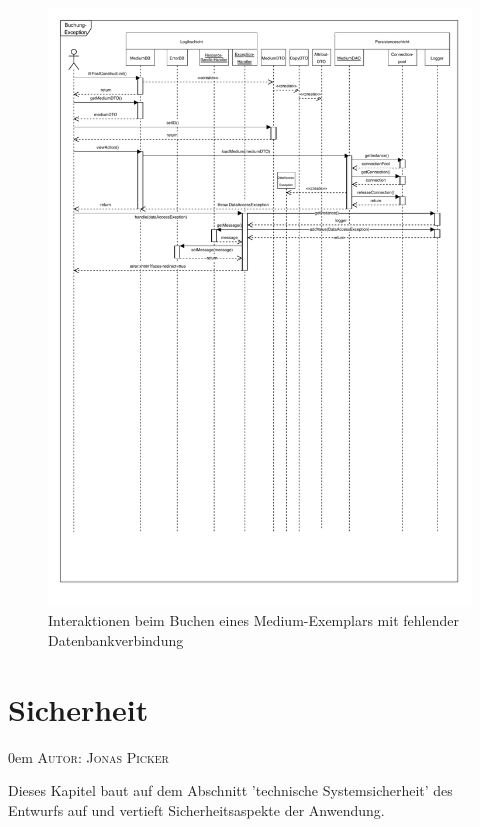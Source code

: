 \documentclass{article}
\makeatletter
\newcommand{\sectionauthor}[1]{
	{\parindent 0em \large \scshape Autor: #1 \par \nobreak \vspace*{1em}}
	\@afterheading
}
\makeatother
\begin{document}
\begin{figure}[h]
	\hypertarget{Fehlersequenz}{}
    \centering
    \includegraphics[width = 50em]{Sequenzdiagramm-exception-v4.1}
    \caption{Interaktionen beim Buchen eines Medium-Exemplars mit fehlender Datenbankverbindung}
    \label{Sequenzdiagramm}
\end{figure}

\restoregeometry
\newpage

\section{Sicherheit}
\sectionauthor{Jonas Picker}
Dieses Kapitel baut auf dem Abschnitt 'technische Systemsicherheit' des Entwurfs auf und vertieft Sicherheitsaspekte der Anwendung.
\end{document}
